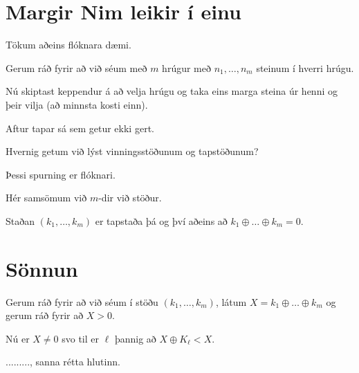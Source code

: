 \section{Margir Nim leikir í einu}
{
    {
        \item<1-> Tökum aðeins flóknara dæmi.
        \item<2-> Gerum ráð fyrir að við séum með $m$ hrúgur með $n_1, \dots, n_m$ steinum í hverri hrúgu.
        \item<3-> Nú skiptast keppendur á að velja hrúgu og taka eins marga steina úr henni og þeir vilja (að minnsta kosti einn).
        \item<4-> Aftur tapar sá sem getur ekki gert.
        \item<5-> Hvernig getum við lýst vinningsstöðunum og tapstöðunum?
        \item<6-> Þessi spurning er flóknari.
        \item<7-> Hér samsömum við $m$-dir við stöður.
        \item<8-> Staðan $(k_1, \dots, k_m)$ er tapstaða þá og því aðeins að $k_1 \oplus \dots \oplus k_m = 0$.
    }
}

\section{Sönnun}
{
    {
        \item<1-> Gerum ráð fyrir að við séum í stöðu $(k_1, \dots, k_m)$,
                    látum $X = k_1 \oplus \dots \oplus k_m$ og
                    gerum ráð fyrir að $X > 0$.
        \item<2-> Nú er $X \neq 0$ svo til er $\ell$ þannig að $X \oplus K_{\ell} < X$.
        \item<3-> ........., sanna rétta hlutinn.
    }
}

